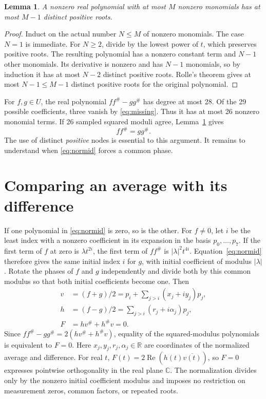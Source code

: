 \documentclass[11pt,a4paper]{article}
\newtheorem{lemma}[theorem]{Lemma}
\newcommand{\CC}{\mathbb C}
\newcommand{\RR}{\mathbb R}
\begin{document}
\begin{lemma}\label{lem:roots}
A nonzero real polynomial with at most $M$ nonzero monomials has at most
$M-1$ distinct positive roots.
\end{lemma}
\begin{proof}
Induct on the actual number $N\le M$ of nonzero monomials.
The case $N=1$ is immediate. For $N\ge2$, divide by the lowest power of
$t$, which preserves positive roots. The resulting polynomial has a
nonzero constant term and $N-1$ other monomials. Its derivative is nonzero
and has $N-1$ monomials, so by induction it has at most $N-2$ distinct
positive roots. Rolle's theorem gives at most $N-1\le M-1$ distinct
positive roots for the original polynomial.
\end{proof}

For $f,g\in U$, the real polynomial $ff^\#-gg^\#$ has degree at most 28.
Of the 29 possible coefficients, three vanish by \eqref{eq:missing}.
Thus it has at most 26 nonzero monomial terms. If 26 sampled squared moduli agree,
Lemma~\ref{lem:roots} gives
\begin{equation}\label{eq:normid}
 ff^\#=gg^\#.
\end{equation}
The use of distinct \emph{positive} nodes is essential to this argument.
It remains to understand when \eqref{eq:normid} forces a common phase.

\section{Comparing an average with its difference}\label{sec:normal}
If one polynomial in \eqref{eq:normid} is zero, so is the other.
For $f\ne0$, let $i$ be the least index with a nonzero coefficient in
its expansion in the basis $p_0,\ldots,p_7$. If the first term of $f$ at
zero is $\lambda t^{2i}$, the first term of $ff^\#$ is
$|\lambda|^2t^{4i}$. Equation~\eqref{eq:normid} therefore gives the same
initial index $i$ for $g$, with initial coefficient of modulus $|\lambda|$.
Rotate the phases of $f$ and $g$ independently and divide both by this common modulus so that
both initial coefficients become one. Then
\begin{equation}\label{eq:vh}
\begin{aligned}
 v&=(f+g)/2=p_i+\sum_{j>i}(x_j+iy_j)p_j,\\
 h&=(f-g)/2=\sum_{j>i}(r_j+i\alpha_j)p_j,\\
 F&=hv^\#+h^\#v=0.
\end{aligned}
\end{equation}
Since $ff^\#-gg^\#=2(hv^\#+h^\#v)$, equality of the squared-modulus
polynomials is equivalent to $F=0$. Here $x_j,y_j,r_j,\alpha_j\in\RR$
are coordinates of the normalized average and difference. For real $t$,
$F(t)=2\operatorname{Re}(h(t)\overline{v(t)})$, so $F=0$ expresses
pointwise orthogonality in the real plane $\CC$. The normalization divides
only by the nonzero initial coefficient modulus and imposes no restriction
on measurement zeros, common factors, or repeated roots.
\end{document}
